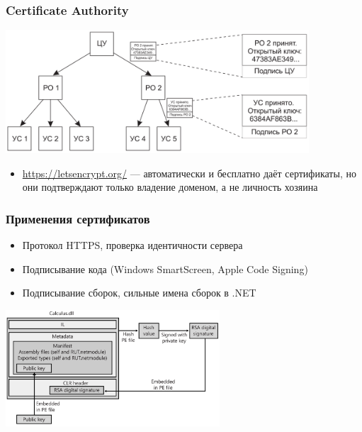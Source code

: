 \documentclass{../cscslides}
\begin{document}
    \begin{frame}
        \frametitle{Certificate Authority}
        \begin{center}
            \includegraphics[width=0.85\textwidth]{certHierarchy.png}
        \end{center}
        \begin{itemize}
            \item \url{https://letsencrypt.org/} --- автоматически и бесплатно даёт сертификаты, но они подтверждают только владение доменом, а не личность хозяина
        \end{itemize}
    \end{frame}

    \begin{frame}
        \frametitle{Применения сертификатов}
        \begin{itemize}
            \item Протокол HTTPS, проверка идентичности сервера
            \item Подписывание кода (Windows SmartScreen, Apple Code Signing)
            \item Подписывание сборок, сильные имена сборок в .NET
        \end{itemize}
        \begin{center}
            \includegraphics[width=0.6\textwidth]{dotNetCodeSigning.png}
        \end{center}
    \end{frame}
\end{document}
